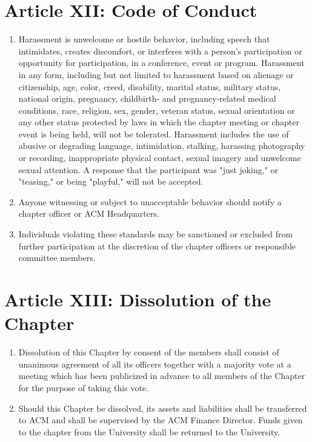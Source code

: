 \section*{Article XII: Code of Conduct}

\begin{enumerate}
  \item Harassment is unwelcome or hostile behavior, including speech that
        intimidates, creates discomfort, or interferes with a person's
        participation or opportunity for participation, in a conference, event
        or program. Harassment in any form, including but not limited to
        harassment based on alienage or citizenship, age, color, creed,
        disability, marital status, military status, national origin, pregnancy,
        childbirth- and pregnancy-related medical conditions, race, religion,
        sex, gender, veteran status, sexual orientation or any other status
        protected by laws in which the chapter meeting or chapter event is being
        held, will not be tolerated. Harassment includes the use of abusive or
        degrading language, intimidation, stalking, harassing photography or
        recording, inappropriate physical contact, sexual imagery and unwelcome
        sexual attention. A response that the participant was "just joking," or
        "teasing," or being "playful," will not be accepted.
  \item Anyone witnessing or subject to unacceptable behavior should notify a
        chapter officer or ACM Headquarters.
  \item Individuals violating these standards may be sanctioned or excluded from
        further participation at the discretion of the chapter officers or
        responsible committee members.
\end{enumerate}

\section*{Article XIII: Dissolution of the Chapter}

\begin{enumerate}
  \item Dissolution of this Chapter by consent of the members shall consist of
        unanimous agreement of all its officers together with a majority vote at
        a meeting which has been publicized in advance to all members of the
        Chapter for the purpose of taking this vote.
  \item Should this Chapter be dissolved, its assets and liabilities shall be
        transferred to ACM and shall be supervised by the ACM Finance Director.
        Funds given to the chapter from the University shall be returned to the
        University.
\end{enumerate}



